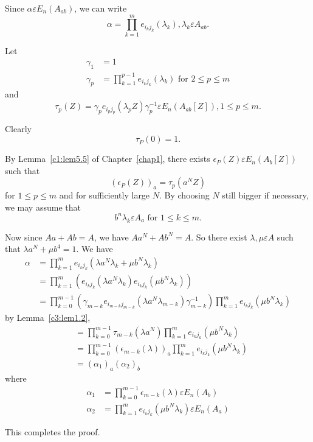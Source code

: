 \begin{Proof}
Since $\alpha \varepsilon E_n(A_{ab})$, we can write
$$
\alpha=\prod\limits_{k=1}^{m}e_{i_{k}j_{k}}(\lambda_k),\lambda_k\varepsilon A_{ab}.
$$

Let 
\begin{align*}
\gamma_1&=1\\
\gamma_p&=\prod\limits_{k=1}^{p-1}e_{i_kj_k}(\lambda_k)\text{ for }
2\leq p \leq m
\end{align*}
and
$$
\tau_p(Z)=\gamma_pe_{i_pj_p}(\lambda_{p}Z)\gamma^{-1}_p\varepsilon
E_n(A_{ab}[Z]),1\leq p\leq m.
$$

Clearly
$$
\tau_P(0)=1.
$$

By Lemma~\ref{c1:lem5.5} of Chapter~\ref{chap1}, there exists
$\epsilon_P(Z)\varepsilon E_n(A_b[Z])$ such that 
$$
(\epsilon_P(Z))_a=\tau_p\left(a^{N}Z\right)
$$
for $1\leq p\leq m$ and for sufficiently large $N$. By choosing $N$
still bigger if necessary, we may assume that 
$$
b^{n}\lambda_k\varepsilon A_a\text{ for }1\leq k\leq m.
$$

Now since $Aa+Ab=A$, we have $Aa^{N}+Ab^{N}=A$. So there exist
$\lambda,\mu\varepsilon A$ such that $\lambda a^{N}+\mu b^{4}=1$. We
have
\begin{align*}
\alpha&=\prod\limits_{k=1}^{m}e_{i_kj_k}\left(\lambda
a^{N}\lambda_k+\mu b^{N}\lambda_k\right)\\
&=\prod\limits_{k=1}^{m}\left(e_{i_kj_k}\left(\lambda
a^{N}\lambda_k\right)e_{i_kj_k}\left(\mu
b^{N}\lambda_{k}\right)\right)\\
&=\prod\limits_{k=0}^{m-1}\left(\gamma_{m-k}e_{i_{m-k}j_{m-k}}\left(\lambda
a^{N}\lambda_{m-k}\right)\gamma^{-1}_{m-k}\right)
\prod\limits_{k=1}^{m}e_{i_kj_k}\left(\mu b^{N}\lambda_k\right)
\end{align*}
by Lemma~\ref{c3:lem1.2},
\begin{align*}
&=\prod\limits_{k=0}^{m-1}\tau_{m-k}\left(\lambda a^{N}\right)
  \prod\limits_{k=1}^{m}e_{i_kj_k}\left(\mu b^{N}\lambda_k\right)\\
&=\prod\limits_{k=0}^{m-1}\left(\epsilon_{m-k}(\lambda)\right)_a\prod\limits_{k=1}^{m}e_{i_kj_k}\left(\mu
  b^{N}\lambda_k\right)\\
&=(\alpha_1)_a(\alpha_2)_b
\end{align*}
where
\begin{align*}
\alpha_1&=\prod\limits_{k=0}^{m-1}\epsilon_{m-k}(\lambda)\varepsilon
E_n(A_b)\\
\alpha_2&=\prod\limits_{k=1}^{m}e_{i_kj_k}\left(\mu
b^{N}\lambda_k\right) \varepsilon E_n(A_a)
\end{align*}

This completes the proof.
\enprf
\end{Proof}

